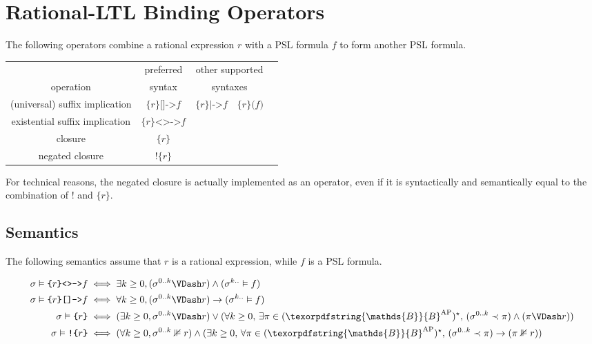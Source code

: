 \documentclass[a4paper,twoside,10pt,DIV=12,draft]{scrreprt}
\newcommand{\B}{\texorpdfstring{\ensuremath{\mathds{B}}}{B}}
\newcommand{\AP}{\ensuremath{\mathrm{AP}}}
\DeclareMathOperator{\NOT}{\texttt{!}}
\newcommand{\0}{\texttt{0}}
\newcommand{\1}{\texttt{1}}
\newcommand{\Esuffix}{\texttt{<>->}}
\newcommand{\Asuffix}{\texttt{[]->}}
\newcommand{\AsuffixALT}{\texttt{|->}}
\newcommand{\ratgroup}[1]{\texttt{\{}#1\texttt{\}}}
\newcommand{\nratgroup}[1]{\texttt{!\{}#1\texttt{\}}}
\def\limplies{\rightarrow}
\begin{document}
\section{Rational-LTL Binding Operators}

The following operators combine a rational expression $r$ with a PSL
formula $f$ to form another PSL formula.

\begin{center}
\begin{tabular}{ccccc}
              & preferred & \multicolumn{2}{c}{other supported} \\
   operation  & syntax    & \multicolumn{2}{c}{syntaxes}\\
  \hline
  (universal) suffix implication
  & $\ratgroup{r}\Asuffix{} f$
  & $\ratgroup{r}\AsuffixALT{} f$
  & $\ratgroup{r}\texttt{(}f\texttt{)}$
  \\
  existential suffix implication
  & $\ratgroup{r}\Esuffix{} f$
  \\
  closure
  & $\ratgroup{r}$
  \\
  negated closure
  & $\nratgroup{r}$
  \\
\end{tabular}
\end{center}

For technical reasons, the negated closure is actually implemented as
an operator, even if it is syntactically and semantically equal to the
combination of $\NOT$ and $\ratgroup{r}$.

\subsection{Semantics}

The following semantics assume that $r$ is a rational expression,
while $f$ is a PSL formula.

\begin{align*}
  \sigma\vDash \ratgroup{r}\Esuffix f &\iff \exists k\ge 0, (\sigma^{0..k}\VDash r)\land(\sigma^{k..}\vDash f)\\
  \sigma\vDash \ratgroup{r}\Asuffix f &\iff \forall k\ge 0, (\sigma^{0..k}\VDash r)\limplies (\sigma^{k..}\vDash f)\\
  \sigma\vDash \ratgroup{r} & \iff (\exists k\ge 0, \sigma^{0..k}\VDash r)\lor(\forall k\ge 0,\,\exists\pi\in(\B^\AP)^\star,\, (\sigma^{0..k}\prec \pi)\land(\pi\VDash r))\\
  \sigma\vDash \nratgroup{r} & \iff (\forall k\ge 0, \sigma^{0..k}\nVDash r)\land(\exists k\ge 0,\,\forall\pi\in(\B^\AP)^\star,\, (\sigma^{0..k}\prec \pi)\limplies(\pi\nVDash r))\\
\end{align*}
\end{document}
